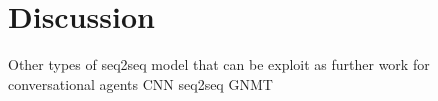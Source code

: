 
\chapter{Discussion} %

\label{Chapter5} %

Other types of seq2seq model that can be exploit as further work for conversational agents
CNN seq2seq \cite{cnn-seq2seq-1705.03122}
GNMT \cite{gnmt-1609.08144}
